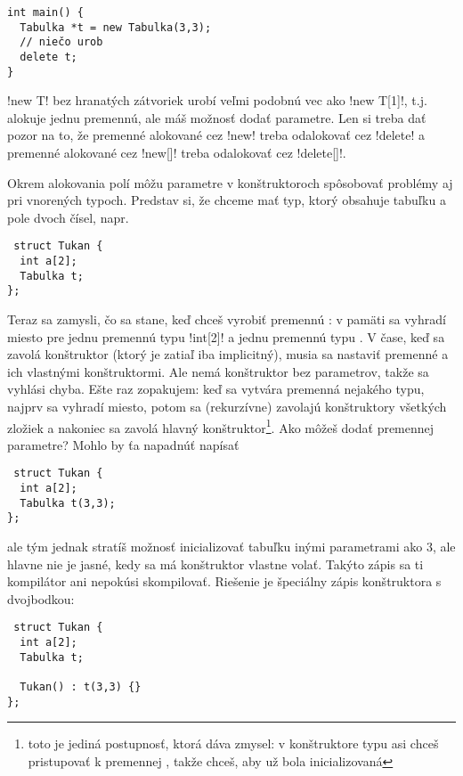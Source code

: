 \begin{lstlisting}[] 
int main() {
  Tabulka *t = new Tabulka(3,3);
  // niečo urob
  delete t;
}
\end{lstlisting}

\prg!new T! bez hranatých zátvoriek urobí veľmi podobnú vec ako \prg!new T[1]!, t.j.
alokuje jednu premennú, ale máš možnosť dodať parametre. Len si treba dať pozor na to,
že premenné alokované cez \prg!new! treba odalokovať cez \prg!delete! a premenné alokované 
cez \prg!new[]! treba odalokovať cez \prg!delete[]!. 


Okrem alokovania polí môžu parametre v konštruktoroch spôsobovať problémy aj pri vnorených 
typoch. Predstav si, že chceme mať typ, ktorý obsahuje tabuľku a pole dvoch čísel, napr.

\begin{lstlisting}
 struct Tukan {
  int a[2];
  Tabulka t;
};
\end{lstlisting}

Teraz sa zamysli, čo sa stane, keď chceš vyrobiť premennú : v pamäti sa vyhradí 
miesto pre jednu premennú typu \prg!int[2]! a jednu premennú typu . V čase, keď
sa zavolá konštruktor  (ktorý je zatiaľ iba implicitný), musia sa nastaviť premenné
 a  ich vlastnými konštruktormi. Ale  nemá konštruktor bez 
parametrov, takže sa vyhlási chyba. Ešte raz zopakujem: keď sa vytvára premenná nejakého typu,
najprv sa vyhradí miesto, potom sa (rekurzívne) zavolajú konštruktory všetkých zložiek
a nakoniec sa zavolá hlavný konštruktor\footnote{toto je jediná postupnosť, ktorá dáva zmysel:
v konštruktore typu  asi chceš pristupovať k premennej ,
takže chceš, aby  už bola inicializovaná}. Ako môžeš dodať premennej 
parametre? Mohlo by ťa napadnúť napísať 

\begin{lstlisting}
 struct Tukan {
  int a[2];
  Tabulka t(3,3);
};
\end{lstlisting}

ale tým jednak stratíš možnosť inicializovať tabuľku inými parametrami ako $3$, ale hlavne
nie je jasné, kedy sa má konštruktor  vlastne volať. Takýto zápis sa
ti kompilátor ani nepokúsi skompilovať. Riešenie je špeciálny zápis konštruktora s
dvojbodkou:

\begin{lstlisting}
 struct Tukan {
  int a[2];
  Tabulka t;

  Tukan() : t(3,3) {}
};
\end{lstlisting}

